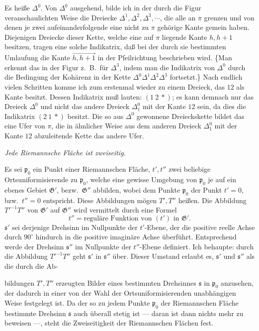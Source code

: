 \documentclass{article}
\begin{document}
Es heiße $\Delta^0$. Von $\Delta^0$ ausgehend, bilde ich in der durch die Figur veranschaulichten Weise die Dreiecke $\Delta^1, \Delta^2, \Delta^3, \cdots$, die alle an $\pi$ grenzen und von denen je zwei aufeinanderfolgende eine nicht zu $\pi$ gehörige Kante gemein haben. Diejenigen Dreiecke dieser Kette, welche eine auf $\pi$ liegende Kante $h, h + 1$ besitzen, tragen eine solche Indikatrix, daß bei der durch sie bestimmten Umlaufung die Kante $\overrightarrow{h, h + 1}$ in der Pfeilrichtung beschrieben wird. \{Man erkennt das in der Figur z.~B.\ für $\Delta^3$, indem man die Indikatrix von $\Delta^0$ durch die Bedingung der Kohärenz in der Kette $\Delta^0 \Delta^1 \Delta^2 \Delta^3$ fortsetzt.\} Nach endlich vielen Schritten komme ich zum erstenmal wieder zu einem Dreieck, das $12$ als Kante besitzt. Dessen Indikatrix muß lauten: $(1\ 2\ *)$; es kann demnach nur das Dreieck $\Delta^0$ und nicht das andere Dreieck $\Delta_1^0$ mit der Kante $12$ sein, da dies die Indikatrix $(2\ 1\ *)$ besitzt. Die so aus $\Delta^0$ gewonnene Dreieckskette bildet das eine Ufer von $\pi$, die in ähnlicher Weise aus dem anderen Dreieck $\Delta_1^0$ mit der Kante $12$ abzuleitende Kette das andere Ufer.

\emph{Jede Riemannsche Fläche ist zweiseitig.}

Es sei $\mathfrak{p}_0$ ein Punkt einer Riemannschen Fläche, $t', t''$ zwei beliebige Ortsuniformisierende zu $\mathfrak{p}_0$, welche eine gewisse Umgebung von $\mathfrak{p}_0$ je auf ein ebenes Gebiet $\mathfrak{G}'$, bezw.\ $\mathfrak{G}''$ abbilden, wobei dem Punkte $\mathfrak{p}_0$ der Punkt $t' = 0$, bzw.\ $t'' = 0$ entspricht. Diese Abbildungen mögen $T', T''$ heißen. Die Abbildung $T'^{-1} T''$ von $\mathfrak{G}'$ auf $\mathfrak{G}''$ wird vermittelt durch eine Formel
\[ t'' = \text{reguläre Funktion von } (t') \text{ in } \mathfrak{G}'. \]
$\mathfrak{s}'$ sei derjenige Drehsinn im Nullpunkte der $t'$-Ebene, der die positive reelle Achse durch $90^\circ$ hindurch in die positive imaginäre Achse überführt. Entsprechend werde der Drehsinn $\mathfrak{s}''$ im Nullpunkte der $t''$-Ebene definiert. Ich behaupte: durch die Abbildung $T'^{-1} T''$ geht $\mathfrak{s}'$ in $\mathfrak{s}''$ über. Dieser Umstand erlaubt es, $\mathfrak{s}'$ und $\mathfrak{s}''$ als die durch die Ab-

bildungen $T', T''$ erzeugten Bilder eines bestimmten Drehsinnes $\mathfrak{s}$ in $\mathfrak{p}_0$ anzusehen, der dadurch in einer von der Wahl der Ortsuniformisierenden unabhängigen Weise festgelegt ist. Da der so zu jedem Punkte $\mathfrak{p}_0$ der Riemannschen Fläche bestimmte Drehsinn $\mathfrak{s}$ auch überall stetig ist --- daran ist dann nichts mehr zu beweisen ---, steht die Zweiseitigkeit der Riemannschen Flächen fest.
\end{document}
